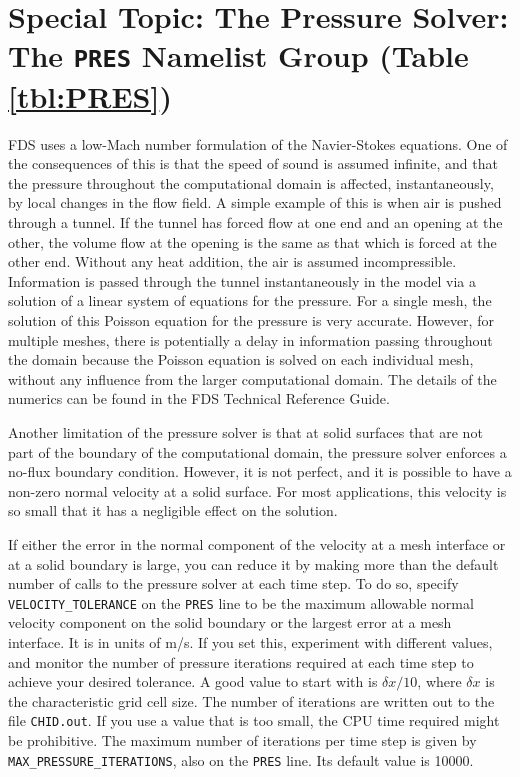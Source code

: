 \documentclass[11pt]{book}
\newcommand{\ct}{\tt\small}
\newcommand{\dx}{\delta x}
\begin{document}
\clearpage

\section{Special Topic: The Pressure Solver: The \texorpdfstring{{\tt PRES}}{PRES} Namelist Group (Table \ref{tbl:PRES})}
\label{info:PRES}

FDS uses a low-Mach number formulation of the Navier-Stokes equations. One of the consequences of this is that the speed of sound is
assumed infinite, and that the pressure throughout the computational domain is affected, instantaneously, by local changes in the flow field. A simple example of
this is when air is pushed through a tunnel. If the tunnel has forced flow at one end and an opening at the other, the volume flow at the opening is the same
as that which is forced at the other end. Without any heat addition, the air is assumed incompressible. Information is passed through the tunnel
instantaneously in the model via a solution of a linear system of equations for the pressure. For a single mesh, the solution of this Poisson equation for
the pressure is very accurate. However, for multiple meshes, there is potentially a delay in information passing throughout the domain because the Poisson
equation is solved on each individual mesh, without any influence from the larger computational domain. The details of the numerics can be found in the
FDS Technical Reference Guide.


Another limitation of the pressure solver is that at solid surfaces that are not part of the boundary of the computational domain,
the pressure solver enforces a no-flux boundary condition. However, it is not perfect, and
it is possible to have a non-zero normal velocity at a solid surface. For most applications, this velocity is so small that it has a negligible effect on the solution.

If either the error in the normal component of the velocity at a mesh interface or at a solid boundary is large, you
can reduce it by making more than the default number of calls to the pressure solver at each time step.
To do so, specify {\ct VELOCITY\_TOLERANCE} on the {\ct PRES} line to be the maximum allowable normal velocity component on the solid
boundary or the largest error at a mesh interface. It is in units of m/s.
If you set this, experiment with different values, and monitor the number of pressure iterations required at each time step to achieve your
desired tolerance. A good value to start with is $\dx/10$, where $\dx$ is the characteristic grid cell size.
The number of iterations are written out to the file {\ct CHID.out}. If you use a value that is too small, the CPU time required might be prohibitive.
The maximum number of iterations per time step is given by {\ct MAX\_PRESSURE\_ITERATIONS}, also on the {\ct PRES} line. Its default value is 10000.
\end{document}
